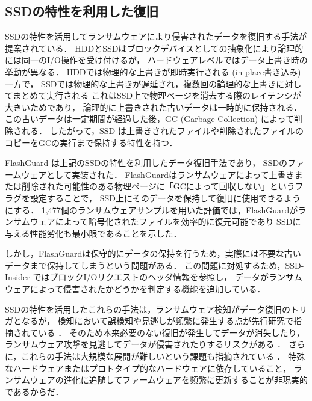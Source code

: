 \subsection{SSDの特性を利用した復旧}
\label{subsec:ssd-recovery}
SSDの特性を活用してランサムウェアにより侵害されたデータを復旧する手法が提案されている．
HDDとSSDはブロックデバイスとしての抽象化により論理的には同一のI/O操作を受け付けるが，
ハードウェアレベルではデータ上書き時の挙動が異なる．
HDDでは物理的な上書きが即時実行される (in-place書き込み) 一方で，
SSDでは物理的な上書きが遅延され，複数回の論理的な上書きに対してまとめて実行される
これはSSD上で物理ページを消去する際のレイテンシが大きいためであり，
論理的に上書きされた古いデータは一時的に保持される．
この古いデータは一定期間が経過した後，GC (Garbage Collection) によって削除される．
したがって，SSD は上書きされたファイルや削除されたファイルのコピーをGCの実行まで保持する特性を持つ．

FlashGuard \cite{huang2017flashguard} は上記のSSDの特性を利用したデータ復旧手法であり，
SSDのファームウェアとして実装された．
FlashGuardはランサムウェアによって上書きまたは削除された可能性のある物理ページに「GCによって回収しない」というフラグを設定することで，
SSD上にそのデータを保持して復旧に使用できるようにする．
1,477個のランサムウェアサンプルを用いた評価では，FlashGuardがランサムウェアによって暗号化されたファイルを効率的に復元可能であり
SSDに与える性能劣化も最小限であることを示した．

しかし，FlashGuardは保守的にデータの保持を行うため，実際には不要な古いデータまで保持してしまうという問題がある．
この問題に対処するため，SSD-Insider \cite{baek2018ssd} ではブロックI/Oリクエストのヘッダ情報を参照し，
データがランサムウェアによって侵害されたかどうかを判定する機能を追加している．

SSDの特性を活用したこれらの手法は，ランサムウェア検知がデータ復旧のトリガとなるが，
検知において誤検知や見逃しが頻繁に発生する点が先行研究で指摘されている \cite{han2020effectiveness}．
そのため本来必要のない復旧が発生してデータが消失したり，ランサムウェア攻撃を見逃してデータが侵害されたりするリスクがある \cite{css2024-enomoto}．
さらに，これらの手法は大規模な展開が難しいという課題も指摘されている \cite{wang2024ransom}．
特殊なハードウェアまたはプロトタイプ的なハードウェアに依存していること，
ランサムウェアの進化に追随してファームウェアを頻繁に更新することが非現実的であるからだ．

